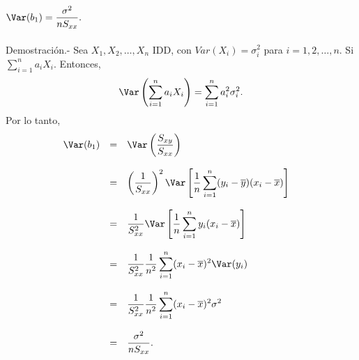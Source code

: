 \begin{teo}
    $\Var(b_1) = \dfrac{\sigma^2}{nS_{xx}}.$\\\\

	Demostración.-\; Sea $X_1,X_2,\ldots,X_n$ IDD, con $Var(X_i)=\sigma_i^2$ para $i=1,2,\ldots,n$. Si $\displaystyle\sum_{i=1}^n a_iX_i.$ Entonces, 
	$$\Var\left(\displaystyle\sum_{i=1}^n a_iX_i\right)=\displaystyle\sum_{i=1}^n a_i^2\sigma_i^2.$$ 
	Por lo tanto,
	$$
	\begin{array}{rcll}
	    \Var(b_1) &=& \Var\left(\dfrac{S_{xy}}{S_{xx}}\right)&\\\\
		      &=& \left(\dfrac{1}{S_{xx}}\right)^2\Var\left[\dfrac{1}{n}\displaystyle\sum_{i=1}^n(y_i-\overline{y})(x_i-\overline{x})\right]&\\\\
		      &=& \dfrac{1}{S_{xx}^2}\Var\left[\dfrac{1}{n}\displaystyle\sum_{i=1}^n y_i(x_i-\overline{x})\right]&\\\\
		      &=& \dfrac{1}{S_{xx}^2}\dfrac{1}{n^2}\displaystyle\sum_{i=1}^n (x_i-\overline{x})^2\Var(y_i)&\\\\
		      &=& \dfrac{1}{S_{xx}^2}\dfrac{1}{n^2}\displaystyle\sum_{i=1}^n (x_i-\overline{x})^2\sigma^2\\\\
		      &=& \dfrac{\sigma^2}{nS_{xx}}.
	\end{array}
	$$
\end{teo}

